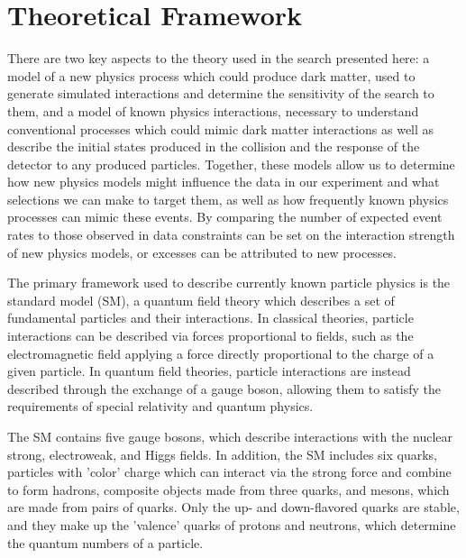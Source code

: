 \chapter{Theoretical Framework}
\label{theory}
There are two key aspects to the theory used in the search presented here: a model of a new physics process which could produce dark matter, used to generate simulated interactions and determine the sensitivity of the search to them, and a model of known physics interactions, necessary to understand conventional processes which could mimic dark matter interactions as well as describe the initial states produced in the collision and the response of the detector to any produced particles.
Together, these models allow us to determine how new physics models might influence the data in our experiment and what selections we can make to target them, as well as how frequently known physics processes can mimic these events.
By comparing the number of expected event rates to those observed in data constraints can be set on the interaction strength of new physics models, or excesses can be attributed to new processes.

The primary framework used to describe currently known particle physics is the standard model (SM), a quantum field theory which describes a set of fundamental particles and their interactions.
In classical theories, particle interactions can be described via forces proportional to fields, such as the electromagnetic field applying a force directly proportional to the charge of a given particle.
In quantum field theories, particle interactions are instead described through the exchange of a gauge boson, allowing them to satisfy the requirements of special relativity and quantum physics. 

The SM contains five gauge bosons, which describe interactions with the nuclear strong, electroweak, and Higgs fields.
In addition, the SM includes six quarks, particles with 'color' charge which can interact via the strong force and combine to form hadrons, composite objects made from three quarks, and mesons, which are made from pairs of quarks. 
Only the up- and down-flavored quarks are stable, and they make up the 'valence' quarks of protons and neutrons, which determine the quantum numbers of a particle.

